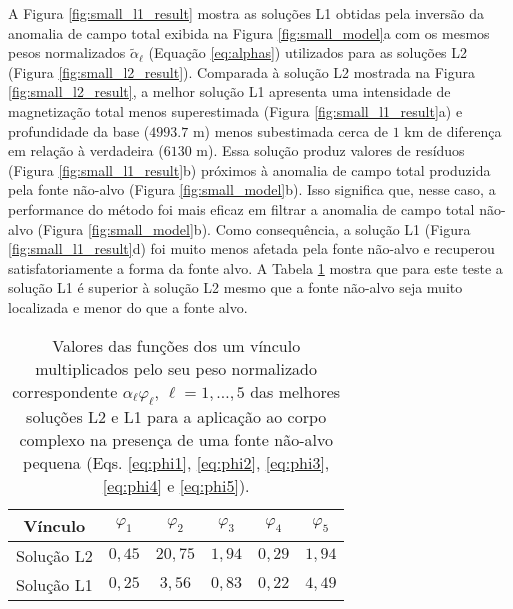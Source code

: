 A Figura \ref{fig:small_l1_result} mostra as soluções L1 obtidas pela inversão da anomalia de campo total exibida na Figura \ref{fig:small_model}a
com os mesmos pesos normalizados $\tilde{\alpha}_{\ell}$ (Equação \ref{eq:alphas})
utilizados para as soluções L2 (Figura \ref{fig:small_l2_result}).
Comparada à solução L2 mostrada na Figura \ref{fig:small_l2_result}, a melhor solução L1 apresenta uma intensidade de magnetização total menos superestimada (Figura 
\ref{fig:small_l1_result}a) e profundidade da base ($4993.7$ m) menos subestimada cerca de $ 1 $ km de diferença em relação à verdadeira ($6130$ m). Essa solução produz valores de resíduos (Figura \ref{fig:small_l1_result}b) 
próximos à anomalia de campo total produzida pela fonte não-alvo (Figura 
\ref{fig:small_model}b). 
Isso significa que, nesse caso, a performance do método foi mais eficaz em filtrar a anomalia de campo total não-alvo (Figura \ref{fig:small_model}b).
Como consequência, a solução L1 (Figura \ref{fig:small_l1_result}d) foi muito menos afetada pela fonte não-alvo e recuperou satisfatoriamente a forma da fonte alvo. 
A Tabela \ref{tab:small} mostra que para este teste a solução L1 é superior à solução L2 mesmo que a fonte não-alvo seja muito localizada e menor do que a fonte alvo.

\begin{table}[h]\label{tab:small}
	\caption{Valores das funções dos um vínculo multiplicados pelo seu peso normalizado correspondente $ \alpha_\ell \varphi_\ell  $, $ \ell=1,\dots,5 $ das melhores soluções L2 e L1 para a aplicação ao corpo complexo na presença de uma fonte não-alvo pequena (Eqs. \ref{eq:phi1}, \ref{eq:phi2}, \ref{eq:phi3}, \ref{eq:phi4} e \ref{eq:phi5}).}
	\centering
	\vspace{0.5cm}
	\begin{tabular}{c|ccccc}
		Vínculo & $ \varphi _1 $ & $ \varphi _2 $ &  $ \varphi _3 $ &  $ \varphi _4 $ &  $ \varphi _5 $ \\
		\hline
		Solução L2 & $ 0,45 $ & $ 20,75 $ & $ 1,94 $ & $ 0,29 $ & $ 1,94 $ \\ 
		Solução L1 & $ 0,25 $ & $ 3,56 $ & $ 0,83 $ & $ 0,22 $ & $ 4,49 $
	\end{tabular}
\end{table}


